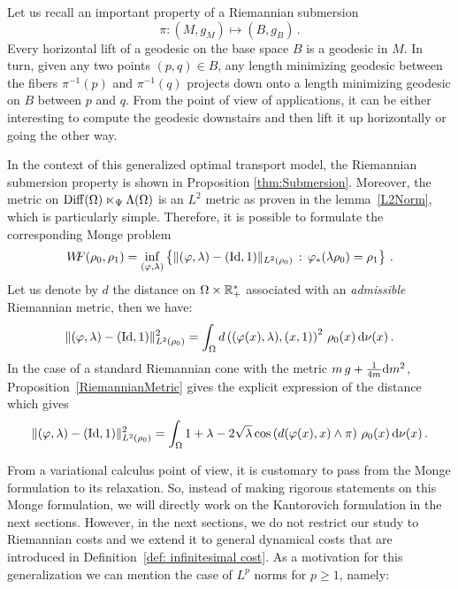 Let us recall an important property of a Riemannian submersion $$\pi: (M,g_M) \mapsto (B,g_B)\,.$$ Every horizontal lift of a geodesic on the base space $B$ is a geodesic in $M$. In turn, given any two points $(p,q) \in B$, any length minimizing geodesic between the fibers $\pi^{-1}(p)$ and $\pi^{-1}(q)$ projects down onto a length minimizing geodesic on $B$ between $p$ and $q$. From the point of view of applications, it can be either interesting to compute the geodesic downstairs and then lift it up horizontally or going the other way.

In the context of this generalized optimal transport model, the Riemannian submersion property is shown in Proposition \ref{thm:Submersion}. Moreover, the metric on $\operatorname{Diff}(\Omega) \ltimes_\Psi \Lambda(\Omega)$ is an $L^2$ metric as proven in the lemma~\ref{L2Norm}, which is particularly simple. Therefore, it is possible to formulate the corresponding Monge problem
\begin{equation}
W\! \! F(\rho_0, \rho_1) = \inf_{(\varphi,\lambda) } \left\{ \| (\varphi,\lambda) - (\operatorname{Id},1)  \|_{L^2(\rho_0)} \, : \, \varphi_* (\lambda \rho_0 )= \rho_1 \right\}\,.
\end{equation}
Let us denote by $d$ the distance on $\Omega \times \mathbb{R}_+^*$ associated with an \textit{admissible} Riemannian metric, then we have:
\begin{equation}
\| (\varphi,\lambda) - (\operatorname{Id},1)  \|_{L^2(\rho_0)}^2 = \int_\Omega d\left( (\varphi(x),\lambda) , (x,1)\right)^2  \, \rho_0(x) \, \mathrm{d} \nu(x) \,.
\end{equation}
In the case of a standard Riemannian cone with the metric $ m \, g + \frac{1}{4 m} \mathrm{d} m^2$, Proposition~\ref{RiemannianMetric} gives the explicit expression of the distance which gives
\begin{equation}
\| (\varphi,\lambda) - (\operatorname{Id},1)  \|_{L^2(\rho_0)}^2 = \int_\Omega 1 + \lambda -2\sqrt{\lambda}  \cos \left(d(\varphi(x),x) \wedge \pi \right)  \, \rho_0(x) \,  \mathrm{d} \nu(x)\,.
\end{equation}

From a variational calculus point of view, it is customary to pass from the Monge formulation to its relaxation. So, instead of making rigorous statements on this Monge formulation, we will directly work on the Kantorovich formulation in the next sections. However, in the next sections, we do not restrict our study to Riemannian costs and we extend it to general dynamical costs that are introduced in Definition~\ref{def: infinitesimal cost}. As a motivation for this generalization we can mention the case of $L^p$ norms for $p\geq 1$, namely:

